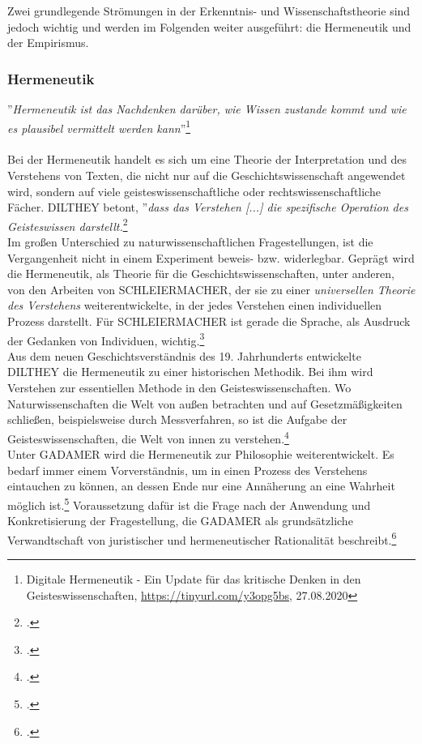 \documentclass[12pt,a4paper]{article}
\begin{document}
Zwei grundlegende Strömungen in der Erkenntnis- und Wissenschaftstheorie sind jedoch wichtig und werden im Folgenden weiter ausgeführt: die Hermeneutik und der Empirismus.


\subsubsection{Hermeneutik}

''\textit{Hermeneutik ist das Nachdenken darüber, wie Wissen zustande kommt und wie es plausibel vermittelt werden kann}''\footnote{Digitale Hermeneutik - Ein Update für das kritische Denken in den Geisteswissenschaften, \url{https://tinyurl.com/y3opg5bs}, 27.08.2020}
\\
\\
Bei der Hermeneutik handelt es sich um eine Theorie der Interpretation und des Verstehens von Texten, die nicht nur auf die Geschichtswissenschaft angewendet wird, sondern auf viele geisteswissenschaftliche oder rechtswissenschaftliche Fächer.
DILTHEY betont, ''\textit{dass das Verstehen [...] die spezifische Operation des Geisteswissen darstellt.}\footcite[][S.82]{ficara2015hermeneutik}
\\
Im großen Unterschied zu naturwissenschaftlichen Fragestellungen, ist die Vergangenheit nicht in einem Experiment beweis- bzw. widerlegbar. Geprägt wird die Hermeneutik, als Theorie für die Geschichtswissenschaften, unter anderen, von den Arbeiten von SCHLEIERMACHER, der sie zu einer \textit{universellen Theorie des Verstehens} weiterentwickelte, in der jedes Verstehen einen individuellen Prozess darstellt. Für SCHLEIERMACHER ist gerade die Sprache, als Ausdruck der Gedanken von Individuen, wichtig.\footcite[][S.72-81]{ficara2015hermeneutik} 
\\
Aus dem neuen Geschichtsverständnis des 19. Jahrhunderts entwickelte DILTHEY die Hermeneutik zu einer historischen Methodik. Bei ihm wird Verstehen zur essentiellen Methode in den Geisteswissenschaften. Wo Naturwissenschaften die Welt von außen betrachten und auf Gesetzmäßigkeiten schließen, beispielsweise durch Messverfahren, so ist die Aufgabe der Geisteswissenschaften, die Welt von innen zu verstehen.\footcite[][S.82-83]{ficara2015hermeneutik}
\\
Unter GADAMER wird die Hermeneutik zur Philosophie weiterentwickelt. Es bedarf immer einem Vorverständnis, um in einen Prozess des Verstehens eintauchen zu können, an dessen Ende nur eine Annäherung an eine Wahrheit möglich ist.\footcite[][S.19-30]{schulz2010neuere} Voraussetzung dafür ist die Frage nach der Anwendung und Konkretisierung der Fragestellung, die GADAMER als grundsätzliche Verwandtschaft von juristischer und hermeneutischer Rationalität beschreibt.\footcite[][S.176-178]{ficara2015hermeneutik}
\end{document}
